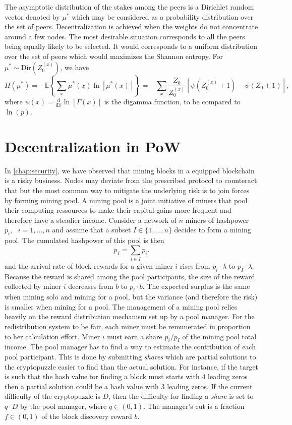 The asymptotic distribution of the stakes among the peers is a Dirichlet random vector denoted by $\mu^{\ast}$ which may be considered as a probability distribution over the set of peers. Decentralization is achieved when the weights do not concentrate around a few nodes. The most desirable situation corresponds to all the peers being equally likely to be selected. It would corresponds to a uniform distribution over the set of peers which would maximizes the Shannon entropy. For $\mu^{\ast}\sim \text{Dir}(Z^{(x)}_0)$, we have 
$$
H(\mu^\ast) = -\mathbb{E}\left\{\sum_x \mu^\ast(x)\ln[\mu^\ast(x)]\right\} = -\sum_x\frac{Z_0}{Z_0^{(x)}}\left[\psi(Z_0^{(x)}+1)-\psi(Z_0+1)\right],
$$
where $\psi(x) = \frac{\text{d}}{\text{d}x}\ln[\Gamma(x)]$ is the digamma function, to be compared to $\ln(p)$.

\section{Decentralization in PoW}\label{sec:decentralization_pow}
In \cref{chap:security}, we have observed that mining blocks in a \PoW equipped blockchain is a risky business. Nodes may deviate from the prescribed protocol to counteract that but the most common way to mitigate the underlying risk is to join forces by forming mining pool. A mining pool is a joint initiative of miners that pool their computing ressources to make their capital gains more frequent and therefore have a steadier income. Consider a network of $n$ miners of hashpower $p_i, \text{ }i = 1,\ldots, n$ and assume that a subset $I\in \{1,\ldots, n\}$ decides to form a mining pool. The cumulated hashpower of this pool is then
\[
p_I = \sum_{i\in I}p_i.
\]
and the arrival rate of block rewards for a given miner $i$ rises from $p_i\cdot\lambda$ to $p_I\cdot\lambda$. Because the reward is shared among the pool participants, the size of the reward collected by miner $i$ decreases from $b$ to $p_i\cdot b$. The expected surplus is the same when mining solo and mining for a pool, but the variance (and therefore the risk) is smaller when mining for a pool. The management of a mining pool relies heavily on the reward distribution mechanism set up by a pool manager. For the redistribution system to be fair, each miner must be remunerated in proportion to her calculation effort. Miner $i$ must earn a share $p_i/p_I$
of the mining pool total income. The pool manager has to find a way to estimate the contribution of each pool participant. This is done by submitting \textit{shares} which are partial solutions to the cryptopuzzle easier to find than the actual solution. For instance, if the target is such that the hash value for finding a block must starts with $4$ leading zeros then a partial solution could be a hash value with $3$ leading zeros.  If the current difficulty of the cryptopuzzle is $D$, then the difficulty for finding a \textit{share} is set to $q\cdot D$ by the pool manager, where $q\in(0,1)$. The manager's cut is a fraction $f\in(0,1)$ of the block discovery reward $b$.\\

